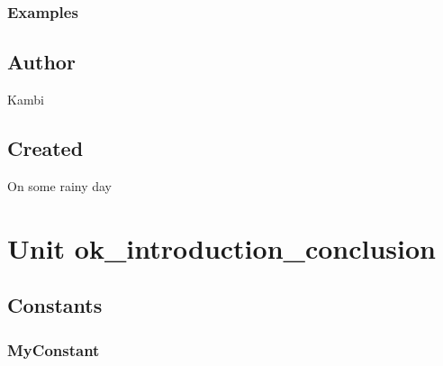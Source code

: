 \documentclass{report}
\newif\ifpdf
\begin{document}
\label{SecIntegersExamples}
\ifpdf
\subsection*{\large{\textbf{Examples}}\normalsize\hspace{1ex}\hrulefill}\else
\subsection*{Examples}
\fi
\section{Author}
\par
Kambi

\section{Created}
\par
On some rainy day


\chapter{Unit ok{\_}introduction{\_}conclusion}
\label{ok_introduction_conclusion}
\section{Constants}
\ifpdf
\subsection*{\large{\textbf{MyConstant}}\normalsize\hspace{1ex}\hrulefill}
\else
\end{document}
